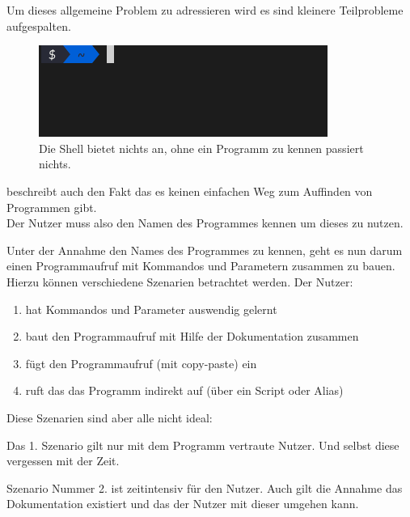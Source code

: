 \documentclass[oneside,bibliography=totocnumbered,BCOR=5mm]{scrbook}
\begin{document}

Um dieses allgemeine Problem zu adressieren wird es sind kleinere Teilprobleme
aufgespalten.

\medskip

\begin{figure}
  \centering
  \includegraphics[scale=0.5]{empty-prompt.png}
  \caption{Die Shell bietet nichts an, ohne ein Programm zu kennen passiert nichts.}
\end{figure}

\cite{Gentner_1996} beschreibt auch den Fakt das es keinen einfachen Weg zum
Auffinden von Programmen gibt.
\\
Der Nutzer muss also den Namen des Programmes kennen um dieses zu nutzen.

\smallskip

Unter der Annahme den Names des Programmes zu kennen, geht es nun darum einen
Programmaufruf mit Kommandos und Parametern zusammen zu bauen.
Hierzu können verschiedene Szenarien betrachtet werden.
Der Nutzer:

\begin{enumerate}
  \item hat Kommandos und Parameter auswendig gelernt
  \item baut den Programmaufruf mit Hilfe der Dokumentation zusammen
  \item fügt den Programmaufruf (mit copy-paste) ein
  \item ruft das das Programm indirekt auf (über ein Script oder Alias)
\end{enumerate}

Diese Szenarien sind aber alle nicht ideal:

\medskip

Das 1. Szenario gilt nur mit dem Programm vertraute Nutzer. Und selbst diese
vergessen mit der Zeit. %

\medskip

Szenario Nummer 2. ist zeitintensiv für den Nutzer. Auch gilt die Annahme das
Dokumentation existiert und das der Nutzer mit dieser umgehen kann.
\end{document}

